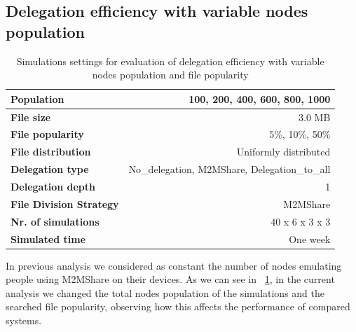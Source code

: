 \subsection{Delegation efficiency with variable nodes population}
\begin{table}[h]
\begin{center}
\begin{tabular}{|l|r|}
\hline
\bfseries Population & 100, 200, 400, 600, 800, 1000 \\
\hline
\bfseries File size & 3.0 MB \\
\hline
\bfseries File popularity & 5\%, 10\%, 50\% \\
\hline
\bfseries File distribution & Uniformly distributed \\
\hline
\bfseries Delegation type & No\_delegation, M2MShare, Delegation\_to\_all \\
\hline
\bfseries Delegation depth & 1 \\
\hline
\bfseries File Division Strategy & M2MShare \\
\hline
\bfseries Nr. of simulations & 40 x 6 x 3 x 3\\
\hline
\bfseries Simulated time & One week \\
\hline
\end{tabular}
\end{center}
\caption{Simulations settings for evaluation of delegation efficiency with variable nodes population and file popularity\label{tab:settingsDiversoNePop}}
\end{table}

In previous analysis we considered as constant the number of nodes emulating people using M2MShare on their devices. As we can see in \tablename~\ref{tab:settingsDiversoNePop}, in the current analysis we changed the total nodes population of the simulations and the searched file popularity, observing how this affects the performance of compared systems.\\

